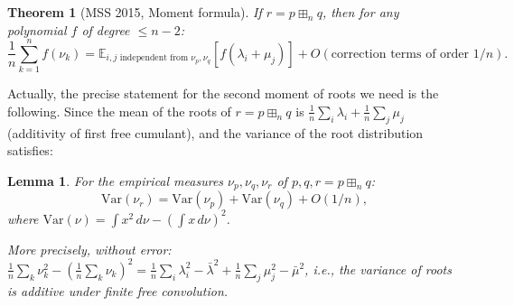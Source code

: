 \documentclass[12pt]{article}
\newtheorem{theorem}{Theorem}
\newtheorem{lemma}{Lemma}
\theoremstyle{definition}
\begin{document}
\begin{theorem}[MSS 2015, Moment formula]\label{thm:MSS}
If $r = p\boxplus_n q$, then for any polynomial $f$ of degree $\leq n-2$:
$$\frac{1}{n}\sum_{k=1}^n f(\nu_k) = \mathbb{E}_{i,j\text{ independent from }\nu_p,\nu_q}[f(\lambda_i+\mu_j)] + O(\text{correction terms of order }1/n).$$
\end{theorem}

Actually, the precise statement for the second moment of roots we need is the following. Since the mean of the roots of $r = p\boxplus_n q$ is $\frac{1}{n}\sum_i\lambda_i + \frac{1}{n}\sum_j\mu_j$ (additivity of first free cumulant), and the variance of the root distribution satisfies:

\begin{lemma}\label{lem:variance-additivity}
For the empirical measures $\nu_p, \nu_q, \nu_r$ of $p, q, r = p\boxplus_n q$:
$$\mathrm{Var}(\nu_r) = \mathrm{Var}(\nu_p) + \mathrm{Var}(\nu_q) + O(1/n),$$
where $\mathrm{Var}(\nu) = \int x^2\,d\nu - (\int x\,d\nu)^2$.

More precisely, without error: $\frac{1}{n}\sum_k\nu_k^2 - \left(\frac{1}{n}\sum_k\nu_k\right)^2 = \frac{1}{n}\sum_i\lambda_i^2 - \bar\lambda^2 + \frac{1}{n}\sum_j\mu_j^2 - \bar\mu^2$, i.e., the variance of roots is additive under finite free convolution.
\end{lemma}
\end{document}
